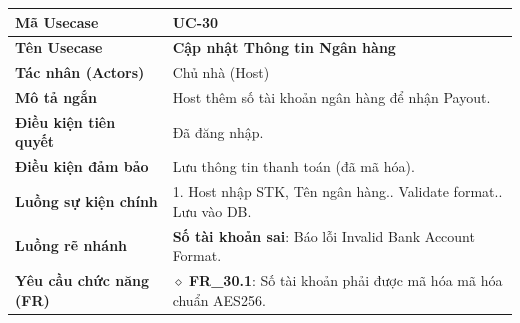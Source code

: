 \begin{table}[H]
\renewcommand{\arraystretch}{1.3}
\centering
\begin{tabularx}{\textwidth}{|p{4.5cm}|X|}
\hline
\cellcolor{gray!15}\bfseries Mã Usecase & \textbf{UC-30} \\ \hline
\cellcolor{gray!15}\bfseries Tên Usecase & \textbf{Cập nhật Thông tin Ngân hàng} \\ \hline
\cellcolor{gray!15}\bfseries Tác nhân (Actors) & Chủ nhà (Host) \\ \hline
\cellcolor{gray!15}\bfseries Mô tả ngắn & Host thêm số tài khoản ngân hàng để nhận Payout. \\ \hline
\cellcolor{gray!15}\bfseries Điều kiện tiên quyết & Đã đăng nhập. \\ \hline
\cellcolor{gray!15}\bfseries Điều kiện đảm bảo & Lưu thông tin thanh toán (đã mã hóa). \\ \hline
\cellcolor{gray!15}\bfseries Luồng sự kiện chính & 1. Host nhập STK, Tên ngân hàng.\newline 2. Validate format.\newline 3. Lưu vào DB. \\ \hline
\cellcolor{gray!15}\bfseries Luồng rẽ nhánh & \textbf{Số tài khoản sai}: Báo lỗi Invalid Bank Account Format. \\ \hline
\cellcolor{gray!15}\bfseries Yêu cầu chức năng (FR) & $\diamond$ \textbf{FR\_30.1}: Số tài khoản phải được mã hóa mã hóa chuẩn AES256. \\ \hline
\end{tabularx}
\end{table}

